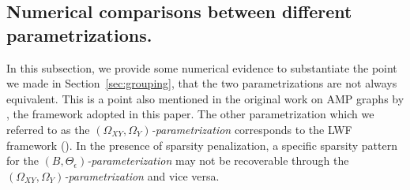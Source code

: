 \subsection{Numerical comparisons between different parametrizations.}

In this subsection, we provide some numerical evidence to substantiate the point we made in Section~\ref{sec:grouping}, that the two parametrizations are not always equivalent. This is a point also mentioned in the original work on
AMP graphs by \citet{andersson2001alternative}, the framework adopted in this paper. The other parametrization which we referred to as the \textit{$(\Omega_{XY},\Omega_Y)$-parametrization} corresponds to the LWF framework (\citet[see][p.34-35]{andersson2001alternative}).  In the presence of sparsity penalization, a specific sparsity pattern for the \textit{$(B,\Theta_\epsilon)$-parameterization} may not be recoverable through the \textit{$(\Omega_{XY},\Omega_Y)$-parametrization} and vice versa. 

